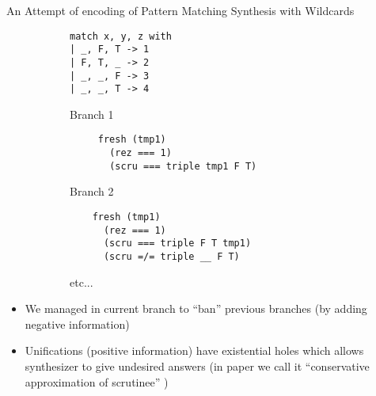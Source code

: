 \documentclass[aspectratio=169
  , xcolor={svgnames}
  , hyperref=
      { colorlinks
      , urlcolor=DarkBlue
      }
  , russian  %
  ]{beamer}
\begin{document}


\begin{frame}[fragile]{An Attempt of encoding of Pattern Matching Synthesis with Wildcards }
\begin{figure}[ht]
  \begin{subfigure}[t]{.35\textwidth}
    \begin{verbatim}
match x, y, z with
| _, F, T -> 1
| F, T, _ -> 2
| _, _, F -> 3
| _, _, T -> 4
    \end{verbatim}

  \end{subfigure}
  \begin{subfigure}[t]{.49\textwidth}
    Branch 1
    \begin{verbatim}
     fresh (tmp1)
       (rez === 1)
       (scru === triple tmp1 F T)
   \end{verbatim}
    Branch 2
    \begin{verbatim}
    fresh (tmp1)
      (rez === 1)
      (scru === triple F T tmp1)
      (scru =/= triple __ F T)
    \end{verbatim}
    etc...
  \end{subfigure}
\end{figure}
\begin{itemize}
\item [\faGood] We managed in current branch to ``ban'' previous branches (by adding negative information)
\item [\faBad] Unifications (positive information) have existential holes which allows synthesizer to give undesired answers (in paper we call it ``conservative approximation of scrutinee'' )
\end{itemize}

\end{frame}
\end{document}
